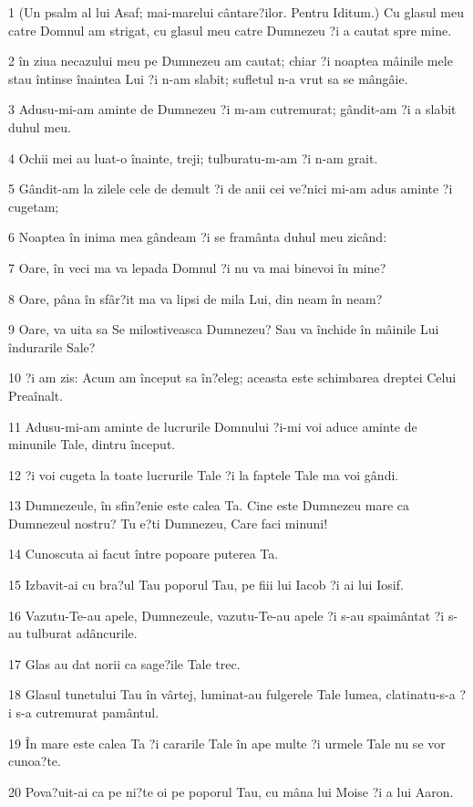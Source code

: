 \par 1 (Un psalm al lui Asaf; mai-marelui cântare?ilor. Pentru Iditum.) Cu glasul meu catre Domnul am strigat, cu glasul meu catre Dumnezeu ?i a cautat spre mine.
\par 2 în ziua necazului meu pe Dumnezeu am cautat; chiar ?i noaptea mâinile mele stau întinse înaintea Lui ?i n-am slabit; sufletul n-a vrut sa se mângâie.
\par 3 Adusu-mi-am aminte de Dumnezeu ?i m-am cutremurat; gândit-am ?i a slabit duhul meu.
\par 4 Ochii mei au luat-o înainte, treji; tulburatu-m-am ?i n-am grait.
\par 5 Gândit-am la zilele cele de demult ?i de anii cei ve?nici mi-am adus aminte ?i cugetam;
\par 6 Noaptea în inima mea gândeam ?i se framânta duhul meu zicând:
\par 7 Oare, în veci ma va lepada Domnul ?i nu va mai binevoi în mine?
\par 8 Oare, pâna în sfâr?it ma va lipsi de mila Lui, din neam în neam?
\par 9 Oare, va uita sa Se milostiveasca Dumnezeu? Sau va închide în mâinile Lui îndurarile Sale?
\par 10 ?i am zis: Acum am început sa în?eleg; aceasta este schimbarea dreptei Celui Preaînalt.
\par 11 Adusu-mi-am aminte de lucrurile Domnului ?i-mi voi aduce aminte de minunile Tale, dintru început.
\par 12 ?i voi cugeta la toate lucrurile Tale ?i la faptele Tale ma voi gândi.
\par 13 Dumnezeule, în sfin?enie este calea Ta. Cine este Dumnezeu mare ca Dumnezeul nostru? Tu e?ti Dumnezeu, Care faci minuni!
\par 14 Cunoscuta ai facut între popoare puterea Ta.
\par 15 Izbavit-ai cu bra?ul Tau poporul Tau, pe fiii lui Iacob ?i ai lui Iosif.
\par 16 Vazutu-Te-au apele, Dumnezeule, vazutu-Te-au apele ?i s-au spaimântat ?i s-au tulburat adâncurile.
\par 17 Glas au dat norii ca sage?ile Tale trec.
\par 18 Glasul tunetului Tau în vârtej, luminat-au fulgerele Tale lumea, clatinatu-s-a ?i s-a cutremurat pamântul.
\par 19 În mare este calea Ta ?i cararile Tale în ape multe ?i urmele Tale nu se vor cunoa?te.
\par 20 Pova?uit-ai ca pe ni?te oi pe poporul Tau, cu mâna lui Moise ?i a lui Aaron.


